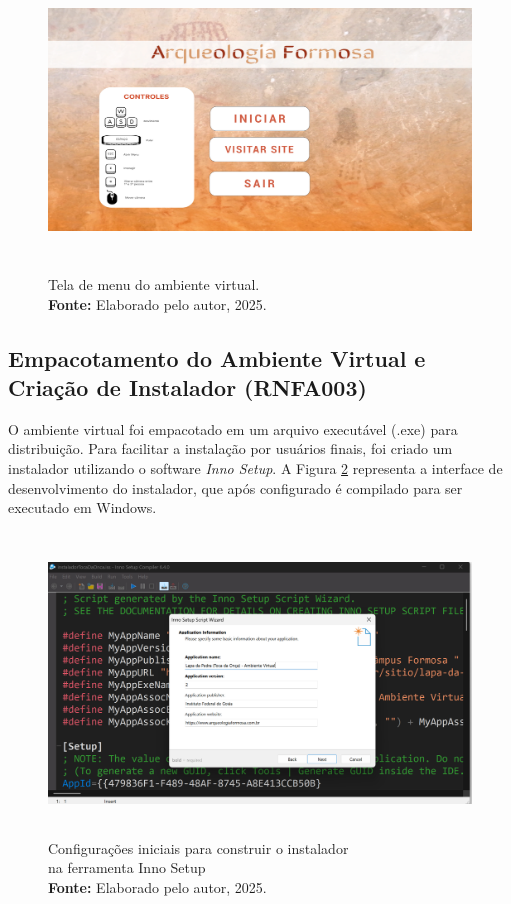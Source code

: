 \begin{figure}[H]
        \centering
        \includegraphics[height=8cm, keepaspectratio]{img/unreal/menu com controles.png}
        \caption{Tela de menu do ambiente virtual. \\
            \textbf{Fonte:} Elaborado pelo autor, 2025.}
        \label{fig:tela_menu}
\end{figure}


\subsection{Empacotamento do Ambiente Virtual e Criação de Instalador (RNFA003)}
O ambiente virtual foi empacotado em um arquivo executável (.exe) para distribuição. Para facilitar a instalação por usuários finais, foi criado um instalador utilizando o software \textit{Inno Setup}. A Figura \ref{fig:configuracao_inno_setup} representa a interface de desenvolvimento do instalador, que após configurado é compilado para ser executado em Windows.

\begin{figure}[H]
        \centering
        \includegraphics[height=8cm, keepaspectratio]{img/Inno setup/configuracao do instalador.png}
        \caption{Configurações iniciais para construir o instalador \\ na ferramenta Inno Setup \\
            \textbf{Fonte:} Elaborado pelo autor, 2025.}
        \label{fig:configuracao_inno_setup}
\end{figure}


